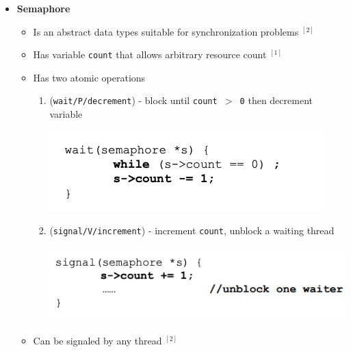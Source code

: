 \documentclass[12pt]{article}
\begin{document}
\begin{enumerate}[1.]
\begin{enumerate}[a)]
\begin{itemize}
            \item \textbf{Semaphore}

            \begin{itemize}
                \item Is an abstract data types suitable for synchronization problems $^{[2]}$
                \item Has variable \texttt{count} that allows arbitrary resource count $^{[1]}$
                \item Has two atomic operations

                \begin{enumerate}[1.]
                    \item (\texttt{wait/P/decrement}) - block until \texttt{count $>$ 0} then decrement variable

                    \begin{center}
                    \includegraphics[width=0.7\linewidth]{images/midterm_1_solution_2.png}
                    \end{center}

                    \item (\texttt{signal/V/increment}) - increment \texttt{count}, unblock a waiting thread

                    \begin{center}
                    \includegraphics[width=0.7\linewidth]{images/midterm_1_solution_3.png}
                    \end{center}
                \end{enumerate}

                \item Can be signaled by any thread $^{[2]}$
            \end{itemize}
        \end{itemize}

        \bigskip


\end{enumerate}
\end{enumerate}
\end{document}
